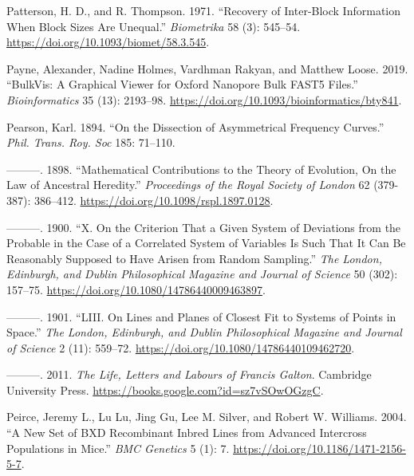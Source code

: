 \documentclass[
]{book}
\newlength{\cslhangindent}
\newlength{\cslentryspacingunit} %
\newenvironment{CSLReferences}[2] %
 {%
  \setlength{\parindent}{0pt}
  \ifodd #1
  \let\oldpar\par
  \def\par{\hangindent=\cslhangindent\oldpar}
  \fi
  \setlength{\parskip}{#2\cslentryspacingunit}
 }%
 {}
\begin{document}
\begin{CSLReferences}{1}{0}
\leavevmode{}%
Patterson, H. D., and R. Thompson. 1971. {``Recovery of Inter-Block Information When Block Sizes Are Unequal.''} \emph{Biometrika} 58 (3): 545--54. \url{https://doi.org/10.1093/biomet/58.3.545}.

\leavevmode{}%
Payne, Alexander, Nadine Holmes, Vardhman Rakyan, and Matthew Loose. 2019. {``{BulkVis}: A Graphical Viewer for {Oxford} Nanopore Bulk {FAST5} Files.''} \emph{Bioinformatics} 35 (13): 2193--98. \url{https://doi.org/10.1093/bioinformatics/bty841}.

\leavevmode{}%
Pearson, Karl. 1894. {``On the Dissection of Asymmetrical Frequency Curves.''} \emph{Phil. Trans. Roy. Soc} 185: 71--110.

\leavevmode{}%
---------. 1898. {``Mathematical Contributions to the Theory of Evolution, {On} the Law of Ancestral Heredity.''} \emph{Proceedings of the Royal Society of London} 62 (379-387): 386--412. \url{https://doi.org/10.1098/rspl.1897.0128}.

\leavevmode{}%
---------. 1900. {``X. {On} the Criterion That a Given System of Deviations from the Probable in the Case of a Correlated System of Variables Is Such That It Can Be Reasonably Supposed to Have Arisen from Random Sampling.''} \emph{The London, Edinburgh, and Dublin Philosophical Magazine and Journal of Science} 50 (302): 157--75. \url{https://doi.org/10.1080/14786440009463897}.

\leavevmode{}%
---------. 1901. {``{LIII}. {On} Lines and Planes of Closest Fit to Systems of Points in Space.''} \emph{The London, Edinburgh, and Dublin Philosophical Magazine and Journal of Science} 2 (11): 559--72. \url{https://doi.org/10.1080/14786440109462720}.

\leavevmode{}%
---------. 2011. \emph{The {Life}, {Letters} and {Labours} of {Francis Galton}}. {Cambridge University Press}. \url{https://books.google.com?id=sz7vSOwOGzgC}.

\leavevmode{}%
Peirce, Jeremy L., Lu Lu, Jing Gu, Lee M. Silver, and Robert W. Williams. 2004. {``A New Set of {BXD} Recombinant Inbred Lines from Advanced Intercross Populations in Mice.''} \emph{BMC Genetics} 5 (1): 7. \url{https://doi.org/10.1186/1471-2156-5-7}.


\end{CSLReferences}
\end{document}
